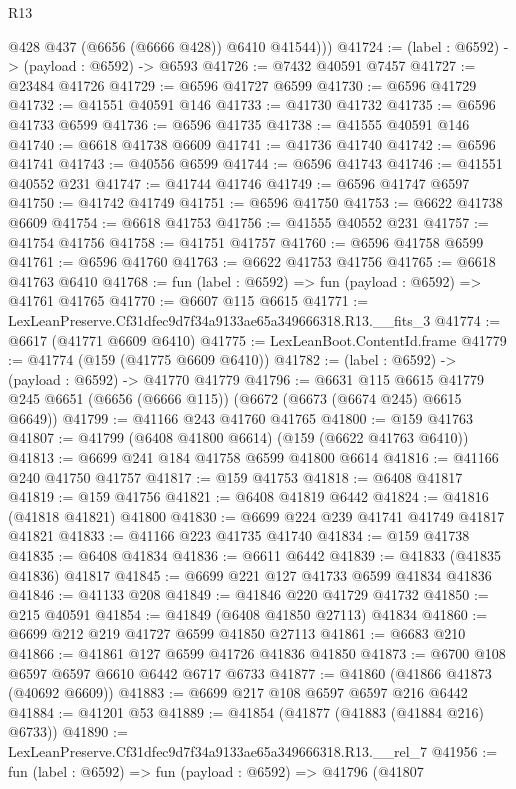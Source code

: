 \begin{lexlean}{R13}
\begin{coremodule}
          @428
          @437
          (@6656 (@6666 @428))
          @6410
          @41544)))
@41724 := (label : @6592) -> (payload : @6592) -> @6593
@41726 := @7432 @40591 @7457
@41727 := @23484 @41726
@41729 := @6596 @41727 @6599
@41730 := @6596 @41729
@41732 := @41551 @40591 @146
@41733 := @41730 @41732
@41735 := @6596 @41733 @6599
@41736 := @6596 @41735
@41738 := @41555 @40591 @146
@41740 := @6618 @41738 @6609
@41741 := @41736 @41740
@41742 := @6596 @41741
@41743 := @40556 @6599
@41744 := @6596 @41743
@41746 := @41551 @40552 @231
@41747 := @41744 @41746
@41749 := @6596 @41747 @6597
@41750 := @41742 @41749
@41751 := @6596 @41750
@41753 := @6622 @41738 @6609
@41754 := @6618 @41753
@41756 := @41555 @40552 @231
@41757 := @41754 @41756
@41758 := @41751 @41757
@41760 := @6596 @41758 @6599
@41761 := @6596 @41760
@41763 := @6622 @41753 @41756
@41765 := @6618 @41763 @6410
@41768 := fun (label : @6592) => fun (payload : @6592) => @41761 @41765
@41770 := @6607 @115 @6615
@41771 := LexLeanPreserve.Cf31dfec9d7f34a9133ae65a349666318.R13.__fits_3
@41774 := @6617 (@41771 @6609 @6410)
@41775 := LexLeanBoot.ContentId.frame
@41779 := @41774 (@159 (@41775 @6609 @6410))
@41782 := (label : @6592) -> (payload : @6592) -> @41770 @41779
@41796 := @6631
    @115
    @6615
    @41779
    @245
    @6651
    (@6656 (@6666 @115))
    (@6672 (@6673 (@6674 @245) @6615 @6649))
@41799 := @41166 @243 @41760 @41765
@41800 := @159 @41763
@41807 := @41799 (@6408 @41800 @6614) (@159 (@6622 @41763 @6410))
@41813 := @6699 @241 @184 @41758 @6599 @41800 @6614
@41816 := @41166 @240 @41750 @41757
@41817 := @159 @41753
@41818 := @6408 @41817
@41819 := @159 @41756
@41821 := @6408 @41819 @6442
@41824 := @41816 (@41818 @41821) @41800
@41830 := @6699 @224 @239 @41741 @41749 @41817 @41821
@41833 := @41166 @223 @41735 @41740
@41834 := @159 @41738
@41835 := @6408 @41834
@41836 := @6611 @6442
@41839 := @41833 (@41835 @41836) @41817
@41845 := @6699 @221 @127 @41733 @6599 @41834 @41836
@41846 := @41133 @208
@41849 := @41846 @220 @41729 @41732
@41850 := @215 @40591
@41854 := @41849 (@6408 @41850 @27113) @41834
@41860 := @6699 @212 @219 @41727 @6599 @41850 @27113
@41861 := @6683 @210
@41866 := @41861 @127 @6599 @41726 @41836 @41850
@41873 := @6700 @108 @6597 @6597 @6610 @6442 @6717 @6733
@41877 := @41860 (@41866 @41873 (@40692 @6609))
@41883 := @6699 @217 @108 @6597 @6597 @216 @6442
@41884 := @41201 @53
@41889 := @41854 (@41877 (@41883 (@41884 @216) @6733))
@41890 := LexLeanPreserve.Cf31dfec9d7f34a9133ae65a349666318.R13.__rel_7
@41956 := fun (label : @6592) =>
  fun (payload : @6592) =>
  @41796
    (@41807

\end{coremodule}
\end{lexlean}
